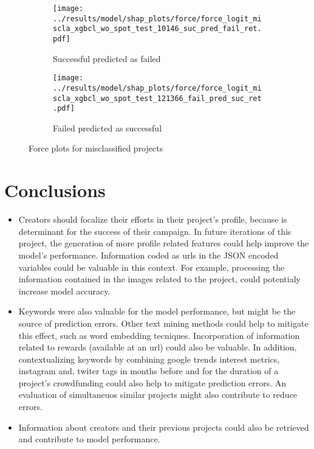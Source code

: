 \documentclass{article}
\begin{document}
\begin{itemize}
\begin{figure}
  \begin{subfigure}{1\linewidth}
    \centering\texttt{[image: ../results/model/shap\_plots/force/force\_logit\_miscla\_xgbcl\_wo\_spot\_test\_10146\_suc\_pred\_fail\_ret.pdf]}
    \caption{Successful predicted as failed}
\label{fig:shapforce1}
  \end{subfigure}
  \begin{subfigure}{1\linewidth}
    \centering\texttt{[image: ../results/model/shap\_plots/force/force\_logit\_miscla\_xgbcl\_wo\_spot\_test\_121366\_fail\_pred\_suc\_ret.pdf]}
    \caption{Failed predicted as successful}
\label{fig:shapforce2}
  \end{subfigure}
\caption{Force plots for misclassified projects}
\label{fig:shapforce}
\end{figure}

\end{itemize}

\section{Conclusions}
\label{sec:conclu}
\begin{itemize}

\item Creators should focalize their efforts in their project's profile, because is determinant for the success of their campaign. In future iterations of this project, the generation of more profile related features could help improve the model's performance. Information coded as urls in the JSON encoded variables could be valuable in this context. For example, processing the information contained in the images related to the project, could potentialy increase model accuracy.

\item Keywords were also valuable for the model performance, but might be the source of prediction errors. Other text mining methods could help to mitigate this effect, such as word embedding tecniques. Incorporation of information related to rewards (available at an url) could also be valuable. In addition, contextualizing keywords by combining google trends interest metrics, instagram and, twiter tags in months before and for the duration of a project's crowdfunding could also help to mitigate prediction errors. An evaluation of simultaneuos similar projects might also contribute to reduce errors.

\item Information about creators and their previous projects could also be retrieved and contribute to model performance. 

\end{itemize}
\end{document}
